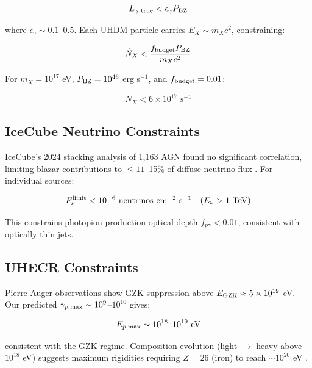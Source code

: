 \documentclass[twocolumn,superscriptaddress,prd,nofootinbib]{revtex4-2}
\begin{document}
\begin{equation}
L_{\gamma,\rm true} < \epsilon_\gamma P_{\rm BZ}
\label{eq:energy_budget}
\end{equation}

where $\epsilon_\gamma \sim 0.1$--$0.5$. Each UHDM particle carries $E_X \sim m_X c^2$, constraining:

\begin{equation}
\dot{N}_X < \frac{f_{\rm budget} P_{\rm BZ}}{m_X c^2}
\label{eq:UHDM_energy_budget}
\end{equation}

For $m_X = 10^{17}$ eV, $P_{\rm BZ} = 10^{46}$ erg s$^{-1}$, and $f_{\rm budget} = 0.01$:

\begin{equation}
\dot{N}_X < 6 \times 10^{17} \text{ s}^{-1}
\label{eq:Ndot_limit}
\end{equation}

\subsection{IceCube Neutrino Constraints}

IceCube's 2024 stacking analysis of 1,163 AGN found no significant correlation, limiting blazar contributions to $\leq 11$--15\% of diffuse neutrino flux \citep{IceCube2024}. For individual sources:

\begin{equation}
F_\nu^{\rm limit} < 10^{-6} \text{ neutrinos cm}^{-2} \text{ s}^{-1} \quad (E_\nu > 1 \text{ TeV})
\label{eq:IceCube_limit}
\end{equation}

This constrains photopion production optical depth $f_{p\gamma} < 0.01$, consistent with optically thin jets.

\subsection{UHECR Constraints}

Pierre Auger observations \citep{Auger2020} show GZK suppression above $E_{\rm GZK} \approx 5 \times 10^{19}$ eV. Our predicted $\gamma_{p,\rm max} \sim 10^9$--$10^{10}$ gives:

\begin{equation}
E_{p,\rm max} \sim 10^{18}\text{--}10^{19} \text{ eV}
\label{eq:E_p_max}
\end{equation}

consistent with the GZK regime. Composition evolution (light $\to$ heavy above $10^{18}$ eV) suggests maximum rigidities requiring $Z = 26$ (iron) to reach $\sim 10^{20}$ eV \citep{Aab2017}.
\end{document}
